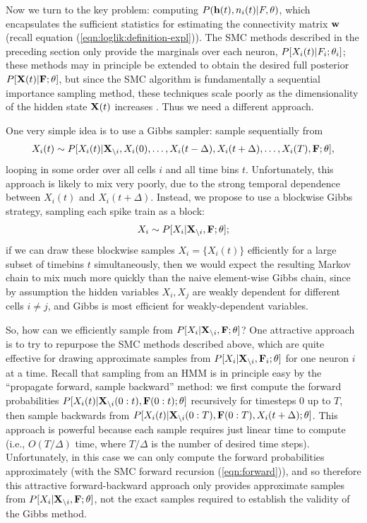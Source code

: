 Now we turn to the key problem: computing $P(\mathbf{h}(t),n_i(t) |
F,\theta)$, which encapsulates the sufficient statistics for
estimating the connectivity matrix $\mathbf{w}$ (recall equation
(\ref{eqn:loglik:definition-expl})).  The SMC methods described in the
preceding section only provide the marginals over each neuron,
$P[X_i(t) | F_i; \mathbf{\theta}_i]$; these methods may in principle be extended
to obtain the desired full posterior $P[{\bf X}(t) | {\bf F}; \mathbf{\theta}]$, but
since the SMC algorithm is fundamentally a sequential importance
sampling method, these techniques scale poorly as the dimensionality
of the hidden state ${\bf X}(t)$ increases \cite{BickelBengtsson08}.  Thus
we need a different approach.

One very simple idea is to use a Gibbs sampler: sample sequentially
from
\begin{align}
X_i(t) \sim P[X_i(t) | \bX_{\i}, X_i(0), \ldots, X_i(t-\Delta),
 X_i(t+\Delta), \ldots, X_i(T), \bF; \bth],
\end{align} 
looping in some order over all cells $i$ and all time bins $t$.
Unfortunately, this approach is likely to mix very poorly, due to the
strong temporal dependence between $X_i(t)$ and $X_i(t+\Delta)$.
Instead, we propose to use a blockwise Gibbs strategy, sampling each
spike train as a block:
\begin{align}
	X_i \sim P[X_i | \bX_{\i}, \bF; \bth];
\end{align} 
if we can draw these blockwise samples $X_i = \{X_i(t)\}$ efficiently
for a large subset of timebins $t$ simultaneously, then we would
expect the resulting Markov chain to mix much more quickly than the
naive element-wise Gibbs chain, since by assumption the hidden
variables $X_i,X_j$ are weakly dependent for different cells $i \neq
j$, and Gibbs is most efficient for weakly-dependent variables.

So, how can we efficiently sample from $P[X_i | {\bf X}_{\backslash i}, {\bf F}; \mathbf{\theta}]$?
One attractive approach is to try to repurpose the SMC methods
described above, which are quite effective for drawing approximate
samples from $P[X_i | {\bf X}_{\backslash i}, {\bf F}_i; \mathbf{\theta}]$ for one neuron $i$ at a
time.  Recall that sampling from an HMM is in principle easy by the
``propagate forward, sample backward'' method: we first compute the
forward probabilities $P[X_i(t) | {\bf X}_{\backslash i}(0:t), {\bf F}(0:t); \mathbf{\theta}]$
recursively for timesteps $0$ up to $T$, then sample backwards from
$P[X_i(t) | {\bf X}_{\backslash i}(0:T), {\bf F}(0:T), X_i(t+\Delta); \mathbf{\theta}]$.  This
approach is powerful because each sample requires just linear time to
compute (i.e., $O(T/\Delta)$ time, where $T/\Delta$ is the number of
desired time steps).  Unfortunately, in this case we can only compute
the forward probabilities approximately (with the SMC forward
recursion (\ref{eqn:forward})), and so therefore this attractive
forward-backward approach only provides approximate samples from
$P[X_i | {\bf X}_{\backslash i}, {\bf F}; \mathbf{\theta}]$, not the exact samples required to
establish the validity of the Gibbs method.

